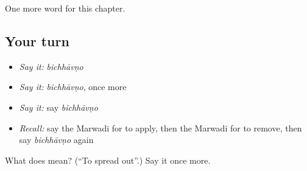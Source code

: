 \begin{grammarlens}[title={What you've built}]
One more word for this chapter.
\end{grammarlens}

\subsection*{Your turn}
\begin{itemize}
\raggedright
  \item \emph{Say it:} \emph{bichhāvṇo}
  \item \emph{Say it:} \emph{bichhāvṇo}, once more
  \item \emph{Say it:} say \emph{bichhāvṇo}
  \item \emph{Recall:} say the Marwadi for to apply, then the Marwadi for to remove, then say \emph{bichhāvṇo} again
\end{itemize}

\begin{tcolorbox}[breakable,colback=teal!4,colframe=teal!35!black,title={Before you move on}]
What does  mean? (\textquotedblleft{}To spread out\textquotedblright{}.) Say it once more.
\end{tcolorbox}
